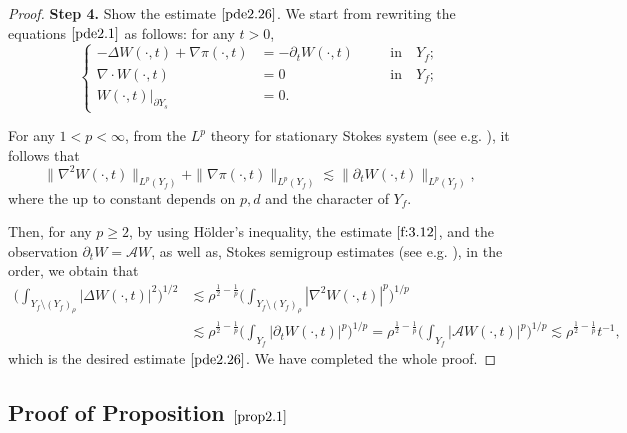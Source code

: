 \documentclass[13pt,CJK]{article}
\theoremstyle{plain}                       %
\theoremstyle{remark}
\numberwithin{equation}{section}
\begin{document}
\begin{proof}
\textbf{Step 4.} Show the estimate $\eqref{pde2.26}$.
We start from rewriting the equations $\eqref{pde2.1}$ as follows: for any $t>0$,
\begin{equation*}
\left\{
\begin{aligned}
-\Delta W(\cdot,t)+\nabla \pi(\cdot,t)&=-\partial_t W(\cdot,t) &\quad&\text{in}\quad Y_f;\\
\nabla\cdot W(\cdot,t)&=0&\quad&\text{in}\quad Y_f;\\
W(\cdot,t)|_{\partial Y_s}&=0.&\quad&
\end{aligned}\right.
\end{equation*}

For any $1<p<\infty$, from the $L^p$ theory for
stationary Stokes system (see e.g. \cite[Chapter IV]{Galdi11}), it follows that
\begin{equation}\label{f:3.12}
\|\nabla^2W(\cdot,t)\|_{L^p(Y_f)}
+\|\nabla\pi(\cdot,t)\|_{L^p(Y_f)}
\lesssim
\|\partial_tW(\cdot,t)\|_{L^p(Y_f)},
\end{equation}
where the up to constant depends on $p,d$ and the character of $Y_f$.


Then, for any $p\geq 2$, by using H\"{o}lder's inequality,
the estimate $\eqref{f:3.12}$, and the observation $\partial_t W
=\mathcal{A}W$, as well as,
Stokes semigroup estimates (see e.g. \cite[Chapter 5]{Tsai18}), in the order, we obtain that
\begin{equation*}
\begin{aligned}
\bigg(
\int_{Y_f\setminus(Y_f)_{\rho}}|\Delta W(\cdot,t)|^2
\bigg)^{1/2}
&\lesssim\rho^{\frac{1}{2}-\frac{1}{p}}
\bigg(
\int_{Y_f\setminus(Y_f)_{\rho}}|\nabla^2 W(\cdot,t)|^p
\bigg)^{1/p}\\
&\lesssim
\rho^{\frac{1}{2}-\frac{1}{p}}
\bigg(
\int_{Y_f}|\partial_t W(\cdot,t)|^p
\bigg)^{1/p}
=\rho^{\frac{1}{2}-\frac{1}{p}}
\bigg(
\int_{Y_f}|\mathcal{A} W(\cdot,t)|^p
\bigg)^{1/p}\lesssim \rho^{\frac{1}{2}-\frac{1}{p}}t^{-1},
\end{aligned}
\end{equation*}
which is the desired estimate $\eqref{pde2.26}$.
We have completed the whole proof.
\end{proof}



\subsection{\centering Proof of Proposition $\ref{prop2.1}$}\label{subsec:3.3}
\end{document}
